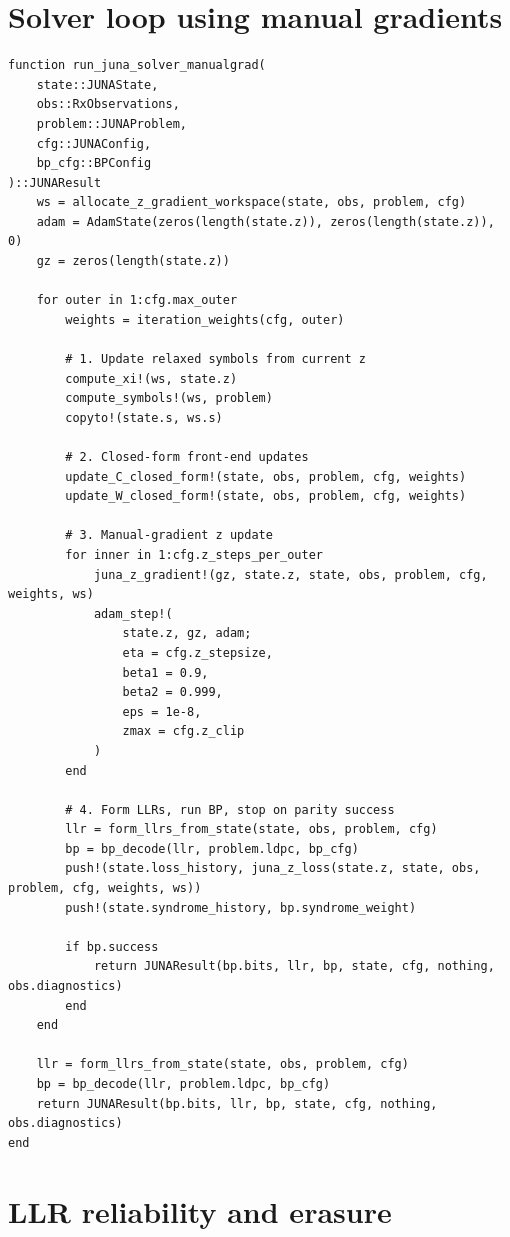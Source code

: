 \documentclass[11pt]{article}
\begin{document}
\section{Solver loop using manual gradients}

\begin{lstlisting}
function run_juna_solver_manualgrad(
    state::JUNAState,
    obs::RxObservations,
    problem::JUNAProblem,
    cfg::JUNAConfig,
    bp_cfg::BPConfig
)::JUNAResult
    ws = allocate_z_gradient_workspace(state, obs, problem, cfg)
    adam = AdamState(zeros(length(state.z)), zeros(length(state.z)), 0)
    gz = zeros(length(state.z))

    for outer in 1:cfg.max_outer
        weights = iteration_weights(cfg, outer)

        # 1. Update relaxed symbols from current z
        compute_xi!(ws, state.z)
        compute_symbols!(ws, problem)
        copyto!(state.s, ws.s)

        # 2. Closed-form front-end updates
        update_C_closed_form!(state, obs, problem, cfg, weights)
        update_W_closed_form!(state, obs, problem, cfg, weights)

        # 3. Manual-gradient z update
        for inner in 1:cfg.z_steps_per_outer
            juna_z_gradient!(gz, state.z, state, obs, problem, cfg, weights, ws)
            adam_step!(
                state.z, gz, adam;
                eta = cfg.z_stepsize,
                beta1 = 0.9,
                beta2 = 0.999,
                eps = 1e-8,
                zmax = cfg.z_clip
            )
        end

        # 4. Form LLRs, run BP, stop on parity success
        llr = form_llrs_from_state(state, obs, problem, cfg)
        bp = bp_decode(llr, problem.ldpc, bp_cfg)
        push!(state.loss_history, juna_z_loss(state.z, state, obs, problem, cfg, weights, ws))
        push!(state.syndrome_history, bp.syndrome_weight)

        if bp.success
            return JUNAResult(bp.bits, llr, bp, state, cfg, nothing, obs.diagnostics)
        end
    end

    llr = form_llrs_from_state(state, obs, problem, cfg)
    bp = bp_decode(llr, problem.ldpc, bp_cfg)
    return JUNAResult(bp.bits, llr, bp, state, cfg, nothing, obs.diagnostics)
end
\end{lstlisting}

\section{LLR reliability and erasure}
\end{document}

